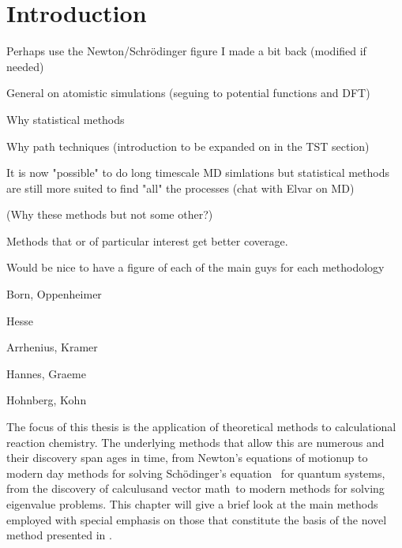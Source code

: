 \section{Introduction}
\label{sec:methods-introduction}


\bit
\item Perhaps use the Newton/Schr\"odinger figure I made a bit back (modified if needed)
\item General on atomistic simulations (seguing to potential functions and DFT)
\item Why statistical methods
\item Why path techniques (introduction to be expanded on in the TST section)
\item It is now "possible" to do long timescale MD simlations but statistical methods are still more suited to find "all" the processes (chat with Elvar on MD)
\item (Why these methods but not some other?)
\item Methods that or of particular interest get better coverage.

\item Would be nice to have a figure of each of the main guys for each methodology
\bit
\item Born, Oppenheimer
\item Hesse
\item Arrhenius, Kramer
\item Hannes, Graeme
\item Hohnberg, Kohn
\eit
\eit

The focus of this thesis is the application of theoretical methods to calculational reaction chemistry.
The underlying methods that allow this are numerous and their discovery span ages in time, from Newton's equations of motion\citemiss up to modern day methods for solving Sch\"odinger's equation~\cite{schrodinger-equation-1926} for quantum systems\cite{hohenberg-kohn-1964, gpaw-review-2010}, from the discovery of calculus\citemiss and vector math~\citemiss to modern methods for solving eigenvalue problems\citemiss.
This chapter will give a brief look at the main methods employed with special emphasis on those that constitute the basis of the novel method presented in .

